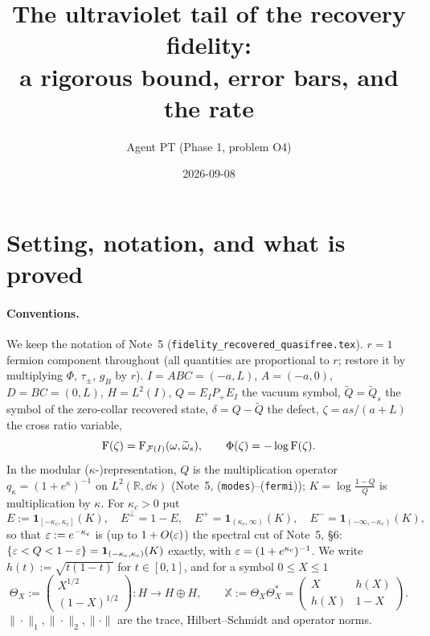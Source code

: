 \documentclass[11pt]{article}
\title{The ultraviolet tail of the recovery fidelity:\\
a rigorous bound, error bars, and the rate}
\author{Agent PT (Phase 1, problem O4)}
\date{2026-09-08}
\providecommand{\one}{\mathbf 1}\providecommand{\CAR}{\mathrm{CAR}}\providecommand{\Ran}{\operatorname{Ran}}\providecommand{\dist}{\operatorname{dist}}\providecommand{\norm}[1]{\lVert #1\rVert}
\begin{document}
\maketitle
\tableofcontents
\section{Setting, notation, and what is proved}\label{sec:setting}

\paragraph{Conventions.}  We keep the notation of Note~5 (\texttt{fidelity\_recovered\_quasifree.tex}).
$r=1$ fermion component throughout (all quantities are proportional to $r$; restore it by multiplying
$\Phi$, $\tau_\pm$, $g_B$ by $r$).  $I=ABC=(-a,L)$, $A=(-a,0)$, $D=BC=(0,L)$, $H=L^2(I)$,
$Q=E_IP_+E_I$ the vacuum symbol, $\widetilde Q=\widetilde Q_s$ the symbol of the zero-collar recovered
state, $\delta=Q-\widetilde Q$ the defect, $\zeta=as/(a+L)$ the cross ratio variable,
\[
 \operatorname{F}(\zeta)=\operatorname{F}_{\mathcal F(I)}(\omega,\widetilde\omega_s),\qquad \Phi(\zeta)=-\log\operatorname{F}(\zeta).
\]
In the modular ($\kappa$-)representation, $Q$ is the multiplication operator $q_\kappa=(1+e^\kappa)^{-1}$
on $L^2(\mathbb R,\dd\kappa)$ (Note~5, (\texttt{modes})--(\texttt{fermi})); $K=\log\frac{1-Q}{Q}$ is
multiplication by $\kappa$.  For $\kappa_c>0$ put
\[
 E:=\one_{[-\kappa_c,\kappa_c]}(K),\quad E^\perp=1-E,\quad E^+=\one_{(\kappa_c,\infty)}(K),\quad
 E^-=\one_{(-\infty,-\kappa_c)}(K),
\]
so that $\varepsilon:=e^{-\kappa_c}$ is (up to $1+O(\varepsilon)$) the spectral cut of Note~5, \S6:
$\{\eps<Q<1-\eps\}=\one_{(-\kappa_c,\kappa_c)}(K)$ exactly, with $\varepsilon=(1+e^{\kappa_c})^{-1}$.
We write $h(t):=\sqrt{t(1-t)}$ for $t\in[0,1]$, and for a symbol $0\le X\le1$
\[
 \Theta_X:=\begin{pmatrix}X^{1/2}\\ (1-X)^{1/2}\end{pmatrix}:H\to H\oplus H,
 \qquad
 \mathbb X:=\Theta_X\Theta_X^*=\begin{pmatrix}X&h(X)\\ h(X)&1-X\end{pmatrix}.
\]
$\|\cdot\|_1,\|\cdot\|_2,\|\cdot\|$ are the trace, Hilbert--Schmidt and operator norms.
\end{document}
